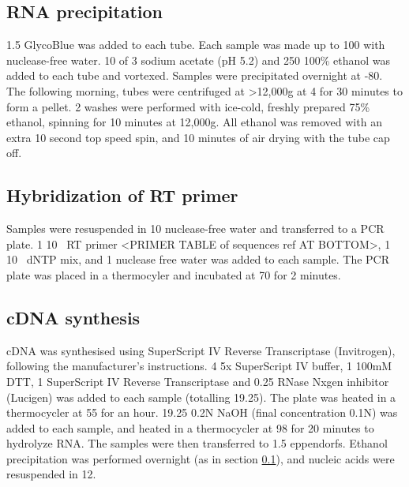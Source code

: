 \subsection{RNA precipitation}\label{subsec:rna_precip}
1.5\ul{} GlycoBlue was added to each tube.
Each sample was made up to 100\ul{} with nuclease-free water.
10\ul{} of 3\si{\Molar} sodium acetate (pH 5.2) and 250\ul{} 100\% ethanol was added to each tube and vortexed.
Samples were precipitated overnight at -80\C{}.
The following morning, tubes were centrifuged at >12,000g at 4\C{} for 30 minutes to form a pellet.
2 washes were performed with ice-cold, freshly prepared 75\% ethanol, spinning for 10 minutes at 12,000g.
All ethanol was removed with an extra 10 second top speed spin, and 10 minutes of air drying with the tube cap off.

\subsection{Hybridization of RT primer}
Samples were resuspended in 10\ul{} nuclease-free water and transferred to a PCR plate.
1\ul{} 10\si{\micro\Molar} RT primer <PRIMER TABLE of sequences ref AT BOTTOM>, 1\ul{} 10\si{\micro\Molar} dNTP mix, and 1\ul{} nuclease free water was added to each sample.
The PCR plate was placed in a thermocyler and incubated at 70\C{} for 2 minutes.

\subsection{cDNA synthesis}
cDNA was synthesised using SuperScript IV Reverse Transcriptase (Invitrogen), following the manufacturer's instructions.
4\ul{} 5x SuperScript IV buffer, 1\ul{} 100mM DTT, 1\ul{} SuperScript IV Reverse Transcriptase and 0.25\ul{} RNase Nxgen inhibitor (Lucigen) was added to each sample (totalling 19.25\ul{}).
The plate was heated in a thermocycler at 55\C{} for an hour.
19.25\ul{} 0.2N NaOH (final concentration 0.1N) was added to each sample, and heated in a thermocycler at 98\C{} for 20 minutes to hydrolyze RNA.
The samples were then transferred to 1.5\ml{} eppendorfs.
Ethanol precipitation was performed overnight (as in section \ref{subsec:rna_precip}), and nucleic acids were resuspended in 12\ul{}.

